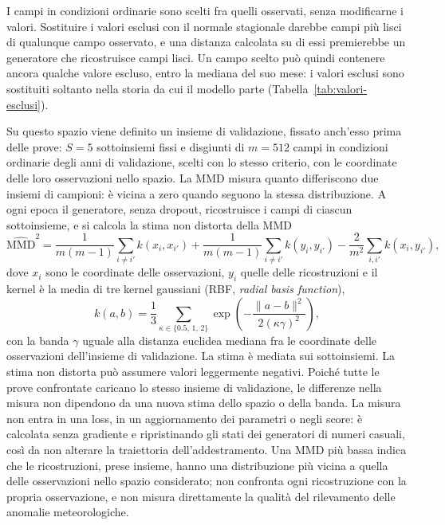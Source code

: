 I campi in condizioni ordinarie sono scelti fra quelli osservati, senza modificarne i valori. Sostituire i valori esclusi con il normale stagionale darebbe campi più lisci di qualunque campo osservato, e una distanza calcolata su di essi premierebbe un generatore che ricostruisce campi lisci. Un campo scelto può quindi contenere ancora qualche valore escluso, entro la mediana del suo mese: i valori esclusi sono sostituiti soltanto nella storia da cui il modello parte (Tabella~\ref{tab:valori-esclusi}).

Su questo spazio viene definito un insieme di validazione, fissato anch'esso prima delle prove: $S=5$ sottoinsiemi fissi e disgiunti di $m=512$ campi in condizioni ordinarie degli anni di validazione, scelti con lo stesso criterio, con le coordinate delle loro osservazioni nello spazio. La MMD misura quanto differiscono due insiemi di campioni: è vicina a zero quando seguono la stessa distribuzione. A ogni epoca il generatore, senza dropout, ricostruisce i campi di ciascun sottoinsieme, e si calcola la stima non distorta della MMD~\cite{gretton2012mmd}
\begin{equation}
\widehat{\mathrm{MMD}}^{2}=
\frac{1}{m(m-1)}\sum_{i\neq i'}k(x_i,x_{i'})
+\frac{1}{m(m-1)}\sum_{i\neq i'}k(y_i,y_{i'})
-\frac{2}{m^{2}}\sum_{i,i'}k(x_i,y_{i'}),
\end{equation}
dove $x_i$ sono le coordinate delle osservazioni, $y_i$ quelle delle ricostruzioni e il kernel è la media di tre kernel gaussiani (RBF, \emph{radial basis function}),
\begin{equation}
k(a,b)=\frac{1}{3}\sum_{\kappa\in\{0.5,\,1,\,2\}}
\exp\!\left(-\frac{\lVert a-b\rVert^{2}}{2(\kappa\gamma)^{2}}\right),
\end{equation}
con la banda $\gamma$ uguale alla distanza euclidea mediana fra le coordinate delle osservazioni dell'insieme di validazione. La stima è mediata sui sottoinsiemi. La stima non distorta può assumere valori leggermente negativi. Poiché tutte le prove confrontate caricano lo stesso insieme di validazione, le differenze nella misura non dipendono da una nuova stima dello spazio o della banda. La misura non entra in una loss, in un aggiornamento dei parametri o negli score: è calcolata senza gradiente e ripristinando gli stati dei generatori di numeri casuali, così da non alterare la traiettoria dell'addestramento. Una MMD più bassa indica che le ricostruzioni, prese insieme, hanno una distribuzione più vicina a quella delle osservazioni nello spazio considerato; non confronta ogni ricostruzione con la propria osservazione, e non misura direttamente la qualità del rilevamento delle anomalie meteorologiche.

